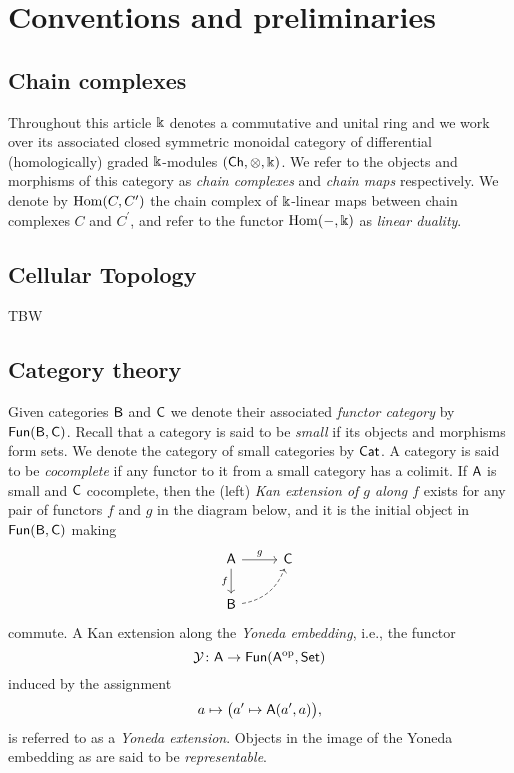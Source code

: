 
\section{Conventions and preliminaries} \label{s:preliminaries}


\subsection{Chain complexes}

Throughout this article $\Bbbk$ denotes a commutative and unital ring and we work over its associated closed symmetric monoidal category of differential (homologically) graded $\Bbbk$-modules $(\mathsf{Ch}, \otimes, \Bbbk)$.
We refer to the objects and morphisms of this category as \textit{chain complexes} and \textit{chain maps} respectively. We denote by $\mathrm{Hom}(C, C^\prime)$ the chain complex of $\Bbbk$-linear maps between chain complexes $C$ and $C^\prime$, and refer to the functor $\mathrm{Hom}(-, \Bbbk)$ as \textit{linear duality}.

\subsection{Cellular Topology}

TBW

\subsection{Category theory}

Given categories $\mathsf{B}$ and $\mathsf{C}$ we denote their associated \textit{functor category} by $\mathsf{Fun}(\mathsf{B}, \mathsf{C})$.
Recall that a category is said to be \textit{small} if its objects and morphisms form sets.
We denote the category of small categories by $\mathsf{Cat}$.
A category is said to be \textit{cocomplete} if any functor to it from a small category has a colimit.
If $\mathsf{A}$ is small and $\mathsf{C}$ cocomplete, then the (left) \textit{Kan extension of $g$ along $f$} exists for any pair of functors $f$ and $g$ in the diagram below, and it is the initial object in $\mathsf{Fun}(\mathsf{B}, \mathsf{C})$ making
\begin{equation*}
\begin{tikzcd}[column sep=normal, row sep=normal]
\sA \arrow[d, "f"'] \arrow[r, "g"] & \sC \\
\sB \arrow[dashed, ur, bend right] & \quad
\end{tikzcd}
\end{equation*}
commute.
A Kan extension along the \textit{Yoneda embedding}, i.e., the functor
\[
\operatorname{\mathcal{Y}} \colon \mathsf{A} \to \mathsf{Fun}(\mathsf{A}^{\mathrm{op}}, \mathsf{Set})
\]
induced by the assignment
\[
a \mapsto \big( a^\prime \mapsto \mathsf{A}(a^\prime, a) \big),
\]
is referred to as a \textit{Yoneda extension}.
Objects in the image of the Yoneda embedding as are said to be \textit{representable}.

